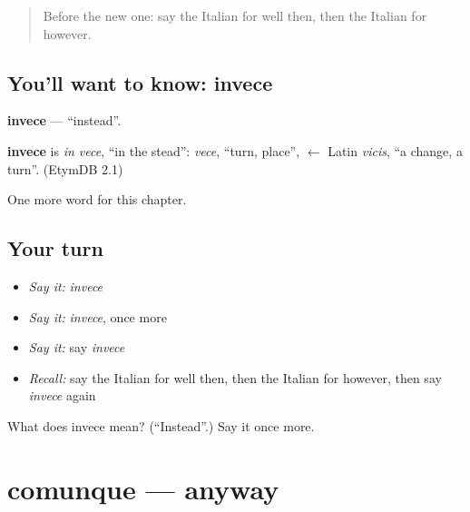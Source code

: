 \label{lesson:IT-C155-invece}



\begin{quote}
Before the new one: say the Italian for well then, then the Italian for however.
\end{quote}

\subsection*{You'll want to know: invece}
\textbf{invece} — \textquotedblleft{}instead\textquotedblright{}.

\begin{cousinweb}
\textbf{invece} is \emph{in vece}, \textquotedblleft{}in the stead\textquotedblright{}: \emph{vece}, \textquotedblleft{}turn, place\textquotedblright{}, $\leftarrow$ Latin \emph{vicis}, \textquotedblleft{}a change, a turn\textquotedblright{}. (EtymDB 2.1)
\end{cousinweb}

\begin{grammarlens}[title={What you've built}]
One more word for this chapter.
\end{grammarlens}

\subsection*{Your turn}
\begin{itemize}
\raggedright
  \item \emph{Say it:} \emph{invece}
  \item \emph{Say it:} \emph{invece}, once more
  \item \emph{Say it:} say \emph{invece}
  \item \emph{Recall:} say the Italian for well then, then the Italian for however, then say \emph{invece} again
\end{itemize}

\begin{tcolorbox}[breakable,colback=teal!4,colframe=teal!35!black,title={Before you move on}]
What does invece mean? (\textquotedblleft{}Instead\textquotedblright{}.) Say it once more.
\end{tcolorbox}
\section[comunque]{comunque — anyway}

\label{lesson:IT-C155-comunque}



